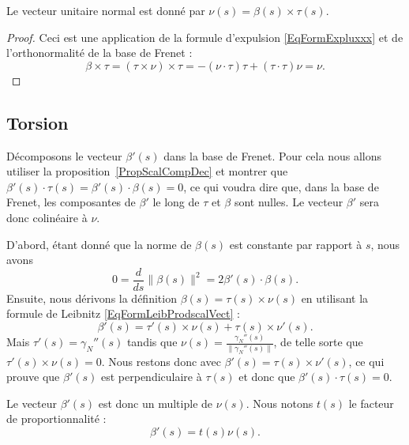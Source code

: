 \begin{lemma}
	Le  vecteur unitaire normal est donné par \( \nu(s)=\beta(s)\times \tau(s)\).
\end{lemma}

\begin{proof}
	Ceci est une application de la formule d'expulsion \eqref{EqFormExpluxxx} et de l'orthonormalité de la base de Frenet :
	\begin{equation}
		\beta\times\tau=(\tau\times\nu)\times\tau=-(\nu\cdot\tau)\tau+(\tau\cdot\tau)\nu=\nu.
	\end{equation}
\end{proof}

\subsection{Torsion}

Décomposons le vecteur \( \beta'(s)\) dans la base de Frenet. Pour cela nous allons utiliser la proposition~\ref{PropScalCompDec} et montrer que \( \beta'(s)\cdot \tau(s)=\beta'(s)\cdot\beta(s)=0\), ce qui voudra dire que, dans la base de Frenet, les composantes de \( \beta'\) le long de \( \tau\) et \( \beta\) sont nulles. Le vecteur \( \beta'\) sera donc colinéaire à \( \nu\).

D'abord, étant donné que la norme de \( \beta(s)\) est constante par rapport à \( s\), nous avons
\begin{equation}
	0=\frac{ d }{ ds }\| \beta(s) \|^2=2\beta'(s)\cdot\beta(s).
\end{equation}
Ensuite, nous dérivons la définition \( \beta(s)=\tau(s)\times\nu(s)\) en utilisant la formule de Leibnitz \eqref{EqFormLeibProdscalVect} :
\begin{equation}
	\beta'(s)=\tau'(s)\times\nu(s)+\tau(s)\times\nu'(s).
\end{equation}
Mais \( \tau'(s)=\gamma_N''(s)\) tandis que \( \nu(s)=\frac{ \gamma_N''(s) }{ \| \gamma_N''(s) \| }\), de telle sorte que \( \tau'(s)\times\nu(s)=0\). Nous restons donc avec \( \beta'(s)=\tau(s)\times\nu'(s)\), ce qui prouve que \( \beta'(s)\) est perpendiculaire à \( \tau(s)\) et donc que \( \beta'(s)\cdot\tau(s)=0\).

Le vecteur \( \beta'(s)\) est donc un multiple de \( \nu(s)\). Nous notons \( t(s)\) le facteur de proportionnalité :
\begin{equation}
	\beta'(s)=t(s)\nu(s).
\end{equation}

